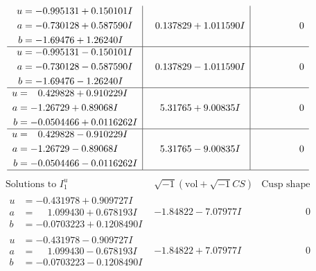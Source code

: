 \documentclass[1p]{elsarticle_modified}
\theoremstyle{definition}
\newcommand{\I}{\sqrt{-1}}
\begin{document}
$$\begin{array}{c|c|c}
\begin{aligned}
u &= -0.995131 + 0.150101 I \\
a &= -0.730128 + 0.587590 I \\
b &= -1.69476 + 1.26240 I\end{aligned}
 & \phantom{-}0.137829 + 1.011590 I & \phantom{-0.000000 } 0 \\ \hline\begin{aligned}
u &= -0.995131 - 0.150101 I \\
a &= -0.730128 - 0.587590 I \\
b &= -1.69476 - 1.26240 I\end{aligned}
 & \phantom{-}0.137829 - 1.011590 I & \phantom{-0.000000 } 0 \\ \hline\begin{aligned}
u &= \phantom{-}0.429828 + 0.910229 I \\
a &= -1.26729 + 0.89068 I \\
b &= -0.0504466 + 0.0116262 I\end{aligned}
 & \phantom{-}5.31765 + 9.00835 I & \phantom{-0.000000 } 0 \\ \hline\begin{aligned}
u &= \phantom{-}0.429828 - 0.910229 I \\
a &= -1.26729 - 0.89068 I \\
b &= -0.0504466 - 0.0116262 I\end{aligned}
 & \phantom{-}5.31765 - 9.00835 I & \phantom{-0.000000 } 0\\
 \hline 
 \end{array}$$\newpage$$\begin{array}{c|c|c}  
\text{Solutions to }I^u_{1}& \I (\text{vol} + \sqrt{-1}CS) & \text{Cusp shape}\\
 \hline 
\begin{aligned}
u &= -0.431978 + 0.909727 I \\
a &= \phantom{-}1.099430 + 0.678193 I \\
b &= -0.0703223 + 0.1208490 I\end{aligned}
 & -1.84822 - 7.07977 I & \phantom{-0.000000 } 0 \\ \hline\begin{aligned}
u &= -0.431978 - 0.909727 I \\
a &= \phantom{-}1.099430 - 0.678193 I \\
b &= -0.0703223 - 0.1208490 I\end{aligned}
 & -1.84822 + 7.07977 I & \phantom{-0.000000 } 0 \\ \hline\begin{aligned}

\end{aligned}
\end{array}$$
\end{document}
